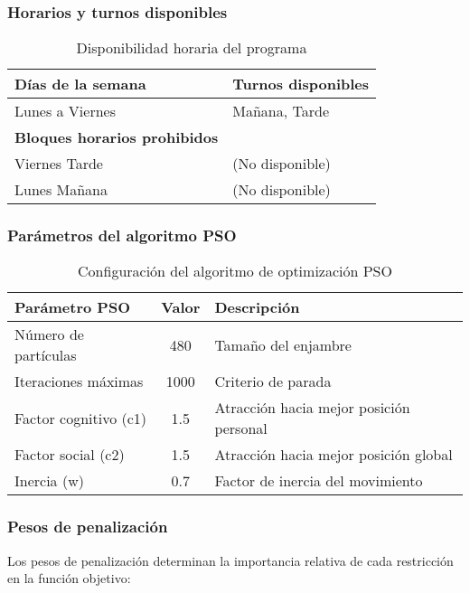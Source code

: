 \subsubsection{Horarios y turnos disponibles}
\begin{table}[ht]
\centering
\begin{tabular}{|l|l|}
\hline
\textbf{Días de la semana} & \textbf{Turnos disponibles} \\
\hline
Lunes a Viernes & Mañana, Tarde \\
\hline
\textbf{Bloques horarios prohibidos} & \\
\hline
Viernes Tarde & (No disponible) \\
Lunes Mañana & (No disponible) \\
\hline
\end{tabular}
\caption{Disponibilidad horaria del programa}
\end{table}

\subsubsection{Parámetros del algoritmo PSO}
\begin{table}[ht]
\centering
\begin{tabular}{|l|c|l|}
\hline
\textbf{Parámetro PSO} & \textbf{Valor} & \textbf{Descripción} \\
\hline
Número de partículas & 480 & Tamaño del enjambre \\
Iteraciones máximas & 1000 & Criterio de parada \\
Factor cognitivo (c1) & 1.5 & Atracción hacia mejor posición personal \\
Factor social (c2) & 1.5 & Atracción hacia mejor posición global \\
Inercia (w) & 0.7 & Factor de inercia del movimiento \\
\hline
\end{tabular}
\caption{Configuración del algoritmo de optimización PSO}
\end{table}

\subsubsection{Pesos de penalización}
Los pesos de penalización determinan la importancia relativa de cada restricción en la función objetivo:

